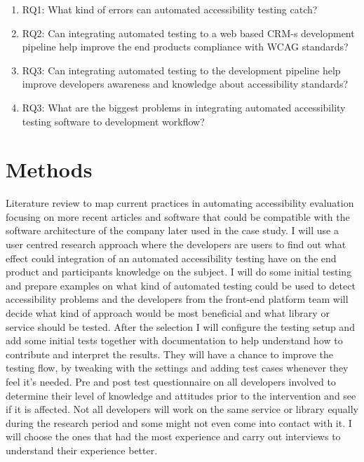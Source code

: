 \documentclass{thesis_proposal}
\begin{document}
\begin{enumerate}
    \item  RQ1: What kind of errors can automated accessibility testing catch?
    \item RQ2: Can integrating automated testing to a web based CRM-s development pipeline help improve the end products compliance with WCAG standards?
    \item RQ3: Can integrating automated testing to the development pipeline help improve developers awareness and knowledge about accessibility standards?
    \item RQ3: What are the biggest problems in integrating automated accessibility testing software to development workflow?
\end{enumerate}
\section{Methods}
Literature review to map current practices in automating accessibility evaluation focusing on more recent articles and software that could be compatible with the software architecture of the company  later used in the case study.
I will use a user centred research approach where the developers are users to find out what effect could integration of an automated accessibility testing have on the end product and participants knowledge on the subject. I will do some initial testing and prepare examples on what kind of automated testing could be used to detect accessibility problems and the developers from the front-end platform team will decide what kind of approach would be most beneficial and what library or service should be tested. 
After the selection I will configure the testing setup and add some initial tests together with documentation to help understand how to contribute and interpret the results. They will have a chance to improve the testing flow, by tweaking with the settings and adding test cases whenever they feel it's needed.
Pre and post test questionnaire on all developers involved to determine their level of knowledge and attitudes prior to the intervention and see if it is affected. Not all developers will work on the same service or library equally during the research period and some might not even come into contact with it. I will choose the ones that had the most experience and carry out interviews to understand their experience better. 
\end{document}
